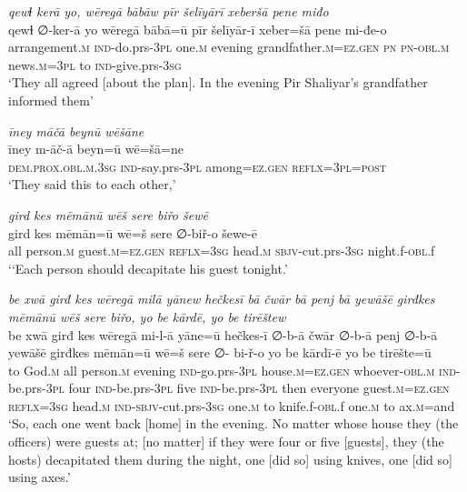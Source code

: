 \ea \label{BP.65}
\textit{qewɫ kerā yo, wēregā bābāw pīr šelīyārī xeberšā pene miđo} \\ 
\gll qewɫ ∅-ker-ā yo wēregā bābā=ū pīr šelīyār-ī xeber=šā pene mi-đe-o \\ 
 arrangement\textsc{.m} \textsc{ind-}do.prs\textsc{-3pl} one\textsc{.m} evening grandfather\textsc{.m}\textsc{=ez.gen} \textsc{pn} \textsc{pn}\textsc{-obl}\textsc{.m} news\textsc{.m}\textsc{=3pl} to \textsc{ind-}give.prs\textsc{-3sg} \\ 
\glt `They all agreed [about the plan]. In the evening Pir Shaliyar’s grandfather informed them'
\z 
 
\ea \label{BP.66}
\textit{īney māčā beynū wēšāne} \\ 
\gll īney m-āč-ā beyn=ū wē=šā=ne \\ 
 \textsc{dem.prox}\textsc{.obl}\textsc{.m}\textsc{.3sg} \textsc{ind-}say.prs\textsc{-3pl} among\textsc{=ez.gen} \textsc{reflx}\textsc{=3pl}\textsc{=\textsc{post}} \\ 
\glt `They said this to each other,'
\z 
 
\ea \label{BP.67}
\textit{gird kes mēmānū wēš sere biřo šewē} \\ 
\gll gird kes mēmān=ū wē=š sere ∅-biř-o šewe-ē \\ 
 all person\textsc{.m} guest\textsc{.m}\textsc{=ez.gen} \textsc{reflx}\textsc{=3sg} head\textsc{.m} \textsc{sbjv-}cut.prs\textsc{-3sg} night.f\textsc{-obl}.f \\ 
\glt `‘Each person should decapitate his guest tonight.'
\z 
 
\ea \label{BP.70}
\textit{be xwā girđ kes wēregā milā yānew hečkesī bā čwār bā penj bā yewāšē girđkes mēmānū wēš sere biřo, yo be kārdē, yo be tirēštew} \\ 
\gll be xwā girđ kes wēregā mi-l-ā yāne=ū hečkes-ī ∅-b-ā čwār ∅-b-ā penj ∅-b-ā yewāšē girđkes mēmān=ū wē=š sere ∅- bi-ř-o yo be kārdī-ē yo be tirēšte=ū \\ 
 to God\textsc{.m} all person\textsc{.m} evening \textsc{ind-}go.prs\textsc{-3pl} house\textsc{.m}\textsc{=ez.gen} whoever\textsc{-obl}\textsc{.m} \textsc{ind-}be.prs\textsc{-3pl} four \textsc{ind-}be.prs\textsc{-3pl} five \textsc{ind-}be.prs\textsc{-3pl} then everyone guest\textsc{.m}\textsc{=ez.gen} \textsc{reflx}\textsc{=3sg} head\textsc{.m} \textsc{ind-}\textsc{sbjv-}cut.prs\textsc{-3sg} one\textsc{.m} to knife.f\textsc{-obl}.f one\textsc{.m} to ax\textsc{.m}=and \\ 
\glt `So, each one went back [home] in the evening. No matter whose house they (the officers) were guests at; [no matter] if they were four or five [guests],  they  (the hosts) decapitated them during the night, one [did so] using knives, one [did so] using axes.'
\z 
 
